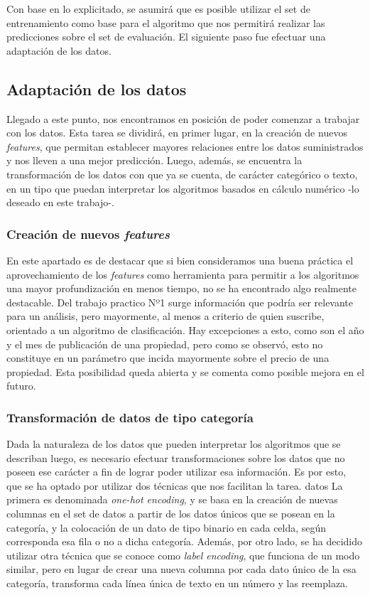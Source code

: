 \documentclass[titlepage,a4paper,11pt]{article}
\begin{document}
Con base en lo explicitado, se asumirá que es posible utilizar el set de entrenamiento como base para el algoritmo que nos permitirá realizar las predicciones sobre el set de evaluación. El siguiente paso fue efectuar una adaptación de los datos.

\subsection{Adaptación de los datos}
Llegado a este punto, nos encontramos en posición de poder comenzar a trabajar con los datos. Esta tarea se dividirá, en primer lugar, en la creación de nuevos \textit{features}, que permitan establecer mayores relaciones entre los datos suministrados y nos lleven a una mejor predicción. Luego, además, se encuentra la transformación de los datos con que ya se cuenta, de carácter categórico o texto, en un tipo que puedan interpretar los algoritmos basados en cálculo numérico -lo deseado en este trabajo-.

\subsubsection{Creación de nuevos \textit{features}}

En este apartado es de destacar que si bien consideramos una buena práctica el aprovechamiento de los \textit{features} como herramienta para permitir a los algoritmos una mayor profundización en menos tiempo, no se ha encontrado algo realmente destacable. Del trabajo practico Nº1 surge información que podría ser relevante para un análisis, pero mayormente, al menos a criterio de quien suscribe, orientado a un algoritmo de clasificación.
Hay excepciones a esto, como son el año y el mes de publicación de una propiedad, pero como se observó, esto no constituye en un parámetro que incida mayormente sobre el precio de una propiedad. Esta posibilidad queda abierta y se comenta como posible mejora en el futuro.

\subsubsection{Transformación de datos de tipo categoría}
Dada la naturaleza de los datos que pueden interpretar los algoritmos que se describan luego, es necesario efectuar transformaciones sobre los datos que no poseen ese carácter a fin de lograr poder utilizar esa información. Es por esto, que se ha optado por utilizar dos técnicas que nos facilitan la tarea. 
datos
La primera es denominada \textit{one-hot encoding}, y se basa en la creación de nuevas columnas en el set de datos a partir de los datos únicos que se posean en la categoría, y la colocación de un dato de tipo binario en cada celda, según corresponda esa fila o no a dicha categoría. Además, por otro lado, se ha decidido utilizar otra técnica que se conoce como \textit{label encoding}, que funciona de un modo similar, pero en lugar de crear una nueva columna por cada dato único de la esa categoría, transforma cada línea única de texto en un número y las reemplaza.
\end{document}
